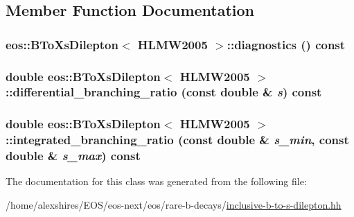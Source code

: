 \subsection{Member Function Documentation}
\hypertarget{classeos_1_1BToXsDilepton_3_01HLMW2005_01_4_a52557122e3fbd57e44a3fad9ef88ce5b}{
\subsubsection[{diagnostics}]{ eos::BToXsDilepton$<$ {\bf HLMW2005} $>$::diagnostics () const}}
\label{classeos_1_1BToXsDilepton_3_01HLMW2005_01_4_a52557122e3fbd57e44a3fad9ef88ce5b}
\hypertarget{classeos_1_1BToXsDilepton_3_01HLMW2005_01_4_ad223046598df015f9571f639095d3ec8}{
\subsubsection[{differential\_\-branching\_\-ratio}]{\setlength{\rightskip}{0pt plus 5cm}double eos::BToXsDilepton$<$ {\bf HLMW2005} $>$::differential\_\-branching\_\-ratio (const double \& {\em s}) const}}
\label{classeos_1_1BToXsDilepton_3_01HLMW2005_01_4_ad223046598df015f9571f639095d3ec8}
\hypertarget{classeos_1_1BToXsDilepton_3_01HLMW2005_01_4_a3871ea69216b034c2e9ba4ef4d81bf35}{
\subsubsection[{integrated\_\-branching\_\-ratio}]{\setlength{\rightskip}{0pt plus 5cm}double eos::BToXsDilepton$<$ {\bf HLMW2005} $>$::integrated\_\-branching\_\-ratio (const double \& {\em s\_\-min}, \/  const double \& {\em s\_\-max}) const}}
\label{classeos_1_1BToXsDilepton_3_01HLMW2005_01_4_a3871ea69216b034c2e9ba4ef4d81bf35}


The documentation for this class was generated from the following file:\begin{DoxyCompactItemize}
\item 
/home/alexshires/EOS/eos-\/next/eos/rare-\/b-\/decays/\hyperlink{inclusive-b-to-s-dilepton_8hh}{inclusive-\/b-\/to-\/s-\/dilepton.hh}\end{DoxyCompactItemize}
